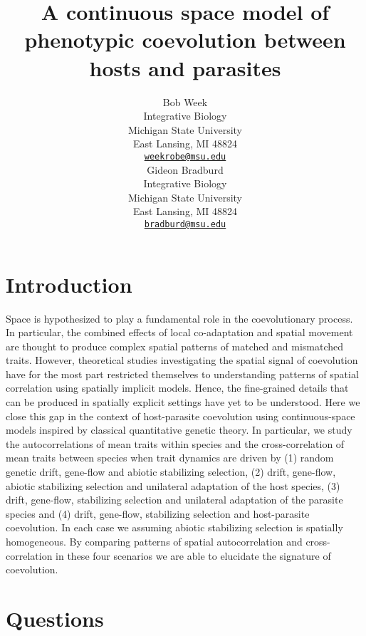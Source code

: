 \documentclass{article}
\title{A continuous space model of phenotypic coevolution between hosts
and parasites}
\author{
    Bob Week
   \\
    Integrative Biology \\
    Michigan State University \\
  East Lansing, MI 48824 \\
  \texttt{\href{mailto:weekrobe@msu.edu}{\nolinkurl{weekrobe@msu.edu}}} \\
   \And
    Gideon Bradburd
   \\
    Integrative Biology \\
    Michigan State University \\
  East Lansing, MI 48824 \\
  \texttt{\href{mailto:bradburd@msu.edu}{\nolinkurl{bradburd@msu.edu}}} \\
  }
\begin{document}
\maketitle

\def\tightlist{}


\begin{abstract}

\end{abstract}


\hypertarget{introduction}{%
\section{Introduction}\label{introduction}}

Space is hypothesized to play a fundamental role in the coevolutionary
process. In particular, the combined effects of local co-adaptation and
spatial movement are thought to produce complex spatial patterns of
matched and mismatched traits. However, theoretical studies
investigating the spatial signal of coevolution have for the most part
restricted themselves to understanding patterns of spatial correlation
using spatially implicit models. Hence, the fine-grained details that
can be produced in spatially explicit settings have yet to be
understood. Here we close this gap in the context of host-parasite
coevolution using continuous-space models inspired by classical
quantitative genetic theory. In particular, we study the
autocorrelations of mean traits within species and the cross-correlation
of mean traits between species when trait dynamics are driven by (1)
random genetic drift, gene-flow and abiotic stabilizing selection, (2)
drift, gene-flow, abiotic stabilizing selection and unilateral
adaptation of the host species, (3) drift, gene-flow, stabilizing
selection and unilateral adaptation of the parasite species and (4)
drift, gene-flow, stabilizing selection and host-parasite coevolution.
In each case we assuming abiotic stabilizing selection is spatially
homogeneous. By comparing patterns of spatial autocorrelation and
cross-correlation in these four scenarios we are able to elucidate the
signature of coevolution.

\hypertarget{questions}{%
\section{Questions}\label{questions}}
\end{document}
